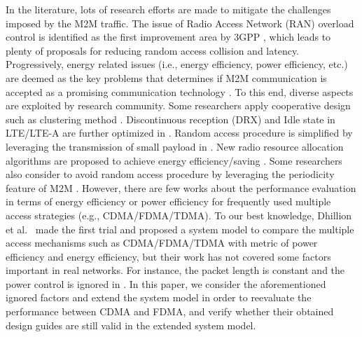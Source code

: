 In the literature, lots of research efforts are made to mitigate the challenges imposed by the M2M traffic. The issue of Radio Access Network (RAN) overload control is identified as the first improvement area by 3GPP \cite{3GPP/TS/37868V11}, which leads to plenty of proposals for reducing random access collision and latency. Progressively, energy related issues (i.e., energy efficiency, power efficiency, etc.) are deemed as the key problems that determines if M2M communication is accepted as a promising communication technology \cite{lu11GRS}. To this end, diverse aspects are exploited by research community. Some researchers apply cooperative design such as clustering method \cite{YuanHo12}\cite{azari14}. Discontinuous reception (DRX) and Idle state in LTE/LTE-A are further optimized in \cite{Gupta2013}. Random access procedure is simplified by leveraging the transmission of small payload in \cite{ChenY10machine}. New radio resource allocation algorithms are proposed to achieve energy efficiency/saving \cite{AijazTNCA14}. Some researchers also consider to avoid random access procedure by leveraging the periodicity feature of M2M \cite{qipeng2015an}.
However, there are few works about the performance evaluation in terms of energy efficiency or power efficiency for frequently used multiple access strategies (e.g., CDMA/FDMA/TDMA). To our best knowledge, Dhillion et al.~\cite{Dhi13} made the first trial and proposed a system model to compare the multiple access mechanisms such as CDMA/FDMA/TDMA with metric of power efficiency and energy efficiency, but their work has not covered some factors important in real networks. For instance, the packet length is constant and the power control is ignored in \cite{Dhi13}. In this paper, we consider the aforementioned ignored factors and extend the system model in order to reevaluate the performance between CDMA and FDMA, and verify whether their obtained design guides are still valid in the extended system model.